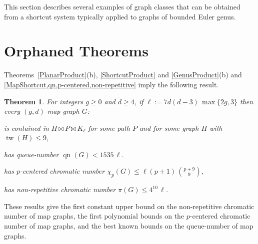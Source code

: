 \documentclass{patmorin}
\theoremstyle{plain}
\newtheorem{thm}{Theorem}
\theoremstyle{definition}
\newcommand{\note}[2]{\noindent{\color{red}[#1:~#2]}}
\DeclareMathOperator{\tw}{tw}
\DeclareMathOperator{\qn}{qn}
\renewcommand{\geq}{\geqslant}
\renewcommand{\leq}{\leqslant}
\begin{document}
This section describes several examples of graph classes that can be obtained from a shortcut system typically applied to graphs of bounded Euler genus.

\section{Orphaned Theorems}

Theorems~\ref{PlanarProduct}(b),  \ref{ShortcutProduct} and  \ref{GenusProduct}(b) and \cref{MapShortcut,qn,p-centered,non-repetitive} imply the following result.


\begin{thm}
\label{MapPartition}
For integers $g\geq 0$ and $d\geq 4$, if $\ell:=  7d(d-3)\, \max\{2g,3\}$ then every $(g,d)$-map graph $G$:
\begin{compactitem}
\item is contained in $H \boxtimes P \boxtimes K_{\ell}$ for some path $P$ and for some graph $H$ with $\tw(H)\leq 9$,
\item has queue-number $\qn(G) <  1535\, \ell $.
\item has $p$-centered chromatic number $\chi_p(G) \leq \ell (p+1)\,  \binom{p+9}{9}$,
\item has non-repetitive chromatic number $ \pi(G) \leq 4^{10}\,\ell $.
\end{compactitem}
\end{thm}

These results give the first constant upper bound on the non-repetitive chromatic number of map graphs, the first polynomial bounds on the $p$-centered chromatic number of map graphs, and the best known bounds on the queue-number of map graphs.
\end{document}
